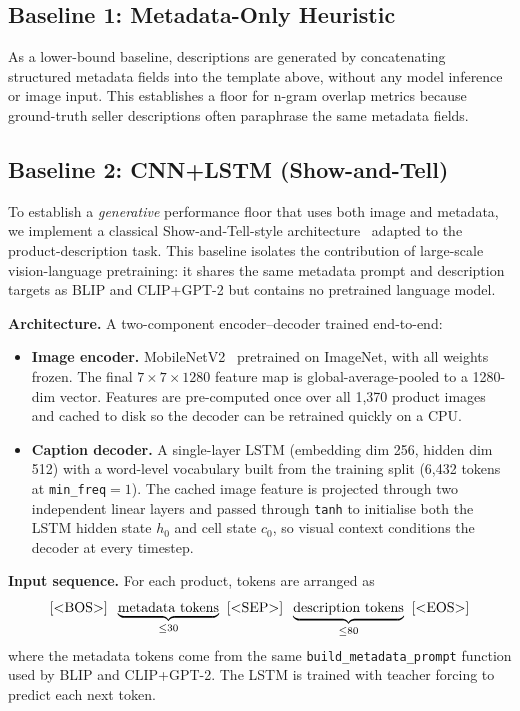 \documentclass[12pt,a4paper]{article}
\begin{document}
\subsection{Baseline 1: Metadata-Only Heuristic}

As a lower-bound baseline, descriptions are generated by concatenating structured
metadata fields into the template above, without any model inference or image input.
This establishes a floor for n-gram overlap metrics because ground-truth seller
descriptions often paraphrase the same metadata fields.

\subsection{Baseline 2: CNN+LSTM (Show-and-Tell)}
\label{sec:baseline_show_and_tell}

To establish a \emph{generative} performance floor that uses both image and metadata,
we implement a classical Show-and-Tell-style architecture~\cite{vinyals2015show}
adapted to the product-description task. This baseline isolates the contribution of
large-scale vision-language pretraining: it shares the same metadata prompt and
description targets as BLIP and CLIP+GPT-2 but contains no pretrained language model.

\textbf{Architecture.} A two-component encoder--decoder trained end-to-end:
\begin{itemize}[noitemsep]
  \item \textbf{Image encoder.} MobileNetV2~\cite{sandler2018mobilenetv2} pretrained
        on ImageNet, with all weights frozen. The final $7 \times 7 \times 1280$
        feature map is global-average-pooled to a 1280-dim vector. Features are
        pre-computed once over all 1{,}370 product images and cached to disk so the
        decoder can be retrained quickly on a CPU.
  \item \textbf{Caption decoder.} A single-layer LSTM (embedding dim 256, hidden
        dim 512) with a word-level vocabulary built from the training split
        (6{,}432 tokens at \texttt{min\_freq}$=1$). The cached image feature is
        projected through two independent linear layers and passed through
        \texttt{tanh} to initialise both the LSTM hidden state $h_0$ and cell
        state $c_0$, so visual context conditions the decoder at every timestep.
\end{itemize}

\textbf{Input sequence.} For each product, tokens are arranged as
\[
  [\text{\textless BOS\textgreater}]\;\;
  \underbrace{\text{metadata tokens}}_{\leq 30}\;\;
  [\text{\textless SEP\textgreater}]\;\;
  \underbrace{\text{description tokens}}_{\leq 80}\;\;
  [\text{\textless EOS\textgreater}]
\]
where the metadata tokens come from the same \texttt{build\_metadata\_prompt}
function used by BLIP and CLIP+GPT-2. The LSTM is trained with teacher forcing
to predict each next token.
\end{document}
